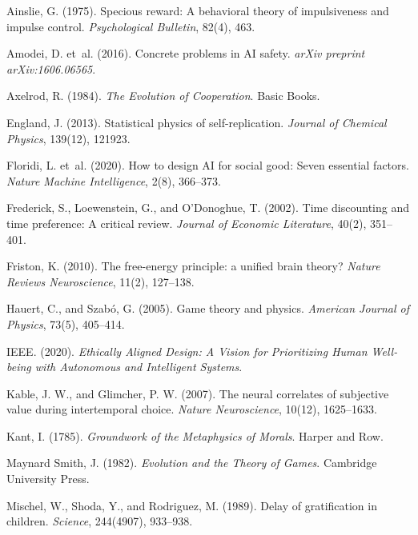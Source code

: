 \documentclass[11pt,a4paper]{article}
\begin{document}

\begin{thebibliography}{}

 Ainslie, G. (1975). Specious reward: A behavioral theory of impulsiveness and impulse control. \textit{Psychological Bulletin}, 82(4), 463.

 Amodei, D. et~al. (2016). Concrete problems in AI safety. \textit{arXiv preprint arXiv:1606.06565}.

 Axelrod, R. (1984). \textit{The Evolution of Cooperation}. Basic Books.

 England, J. (2013). Statistical physics of self-replication. \textit{Journal of Chemical Physics}, 139(12), 121923.

 Floridi, L. et~al. (2020). How to design AI for social good: Seven essential factors. \textit{Nature Machine Intelligence}, 2(8), 366--373.

 Frederick, S., Loewenstein, G., and O'Donoghue, T. (2002). Time discounting and time preference: A critical review. \textit{Journal of Economic Literature}, 40(2), 351--401.

 Friston, K. (2010). The free-energy principle: a unified brain theory? \textit{Nature Reviews Neuroscience}, 11(2), 127--138.

 Hauert, C., and Szabó, G. (2005). Game theory and physics. \textit{American Journal of Physics}, 73(5), 405--414.

 IEEE. (2020). \textit{Ethically Aligned Design: A Vision for Prioritizing Human Well-being with Autonomous and Intelligent Systems}.

 Kable, J. W., and Glimcher, P. W. (2007). The neural correlates of subjective value during intertemporal choice. \textit{Nature Neuroscience}, 10(12), 1625--1633.

 Kant, I. (1785). \textit{Groundwork of the Metaphysics of Morals}. Harper and Row.

 Maynard Smith, J. (1982). \textit{Evolution and the Theory of Games}. Cambridge University Press.

 Mischel, W., Shoda, Y., and Rodriguez, M. (1989). Delay of gratification in children. \textit{Science}, 244(4907), 933--938.


\end{thebibliography}
\end{document}
